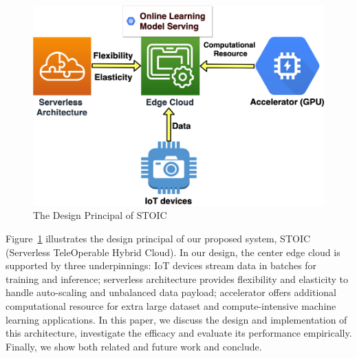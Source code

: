 \begin{figure}
    \centering
    \includegraphics[scale=0.27]{figures/edge}
    \caption{The Design Principal of STOIC }
    \label{fig:edge}
\end{figure}

Figure~\ref{fig:edge} illustrates the design principal of our proposed system, STOIC (Serverless TeleOperable Hybrid Cloud). In our design, the center edge cloud is supported by three underpinnings: IoT devices stream data in batches for training and inference; serverless architecture provides flexibility and elasticity to handle auto-scaling and unbalanced data payload; accelerator offers additional computational resource for extra large dataset and compute-intensive machine learning applications. In this paper, we discuss the design and implementation of this architecture, investigate the efficacy and evaluate its performance empirically. Finally, we show both related and future work and conclude.
